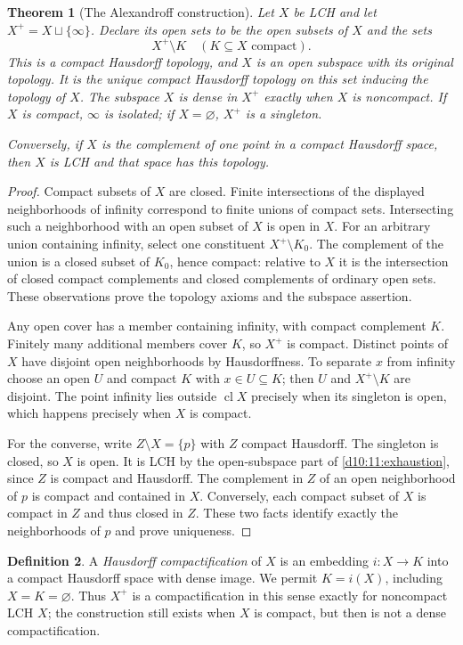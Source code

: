 \documentclass[11pt,oneside,openany]{book}
\newtheorem{theorem}{Theorem}[chapter]
\theoremstyle{definition}
\newtheorem{definition}[theorem]{Definition}
\theoremstyle{remark}
\DeclareMathOperator{\cl}{cl}
\begin{document}
\begin{theorem}[The Alexandroff construction]\label{d10:11:one-point}
Let $X$ be LCH and let $X^+=X\sqcup\{\infty\}$. Declare its open sets to be the open subsets of $X$ and the sets
\[
 X^+\setminus K\quad(K\subseteq X\text{ compact}).
\]
This is a compact Hausdorff topology, and $X$ is an open subspace with its original topology. It is the unique compact Hausdorff topology on this set inducing the topology of $X$. The subspace $X$ is dense in $X^+$ exactly when $X$ is noncompact. If $X$ is compact, $\infty$ is isolated; if $X=\varnothing$, $X^+$ is a singleton.

Conversely, if $X$ is the complement of one point in a compact Hausdorff space, then $X$ is LCH and that space has this topology.
\end{theorem}
\begin{proof}
Compact subsets of $X$ are closed. Finite intersections of the displayed neighborhoods of infinity correspond to finite unions of compact sets. Intersecting such a neighborhood with an open subset of $X$ is open in $X$. For an arbitrary union containing infinity, select one constituent $X^+\setminus K_0$. The complement of the union is a closed subset of $K_0$, hence compact: relative to $X$ it is the intersection of closed compact complements and closed complements of ordinary open sets. These observations prove the topology axioms and the subspace assertion.

Any open cover has a member containing infinity, with compact complement $K$. Finitely many additional members cover $K$, so $X^+$ is compact. Distinct points of $X$ have disjoint open neighborhoods by Hausdorffness. To separate $x$ from infinity choose an open $U$ and compact $K$ with $x\in U\subseteq K$; then $U$ and $X^+\setminus K$ are disjoint. The point infinity lies outside $\cl X$ precisely when its singleton is open, which happens precisely when $X$ is compact.

For the converse, write $Z\setminus X=\{p\}$ with $Z$ compact Hausdorff. The singleton is closed, so $X$ is open. It is LCH by the open-subspace part of \cref{d10:11:exhaustion}, since $Z$ is compact and Hausdorff. The complement in $Z$ of an open neighborhood of $p$ is compact and contained in $X$. Conversely, each compact subset of $X$ is compact in $Z$ and thus closed in $Z$. These two facts identify exactly the neighborhoods of $p$ and prove uniqueness.
\end{proof}

\begin{definition}\label{d10:11:compactification}
A \emph{Hausdorff compactification} of $X$ is an embedding $i:X\to K$ into a compact Hausdorff space with dense image. We permit $K=i(X)$, including $X=K=\varnothing$. Thus $X^+$ is a compactification in this sense exactly for noncompact LCH $X$; the construction still exists when $X$ is compact, but then is not a dense compactification.
\end{definition}
\end{document}
